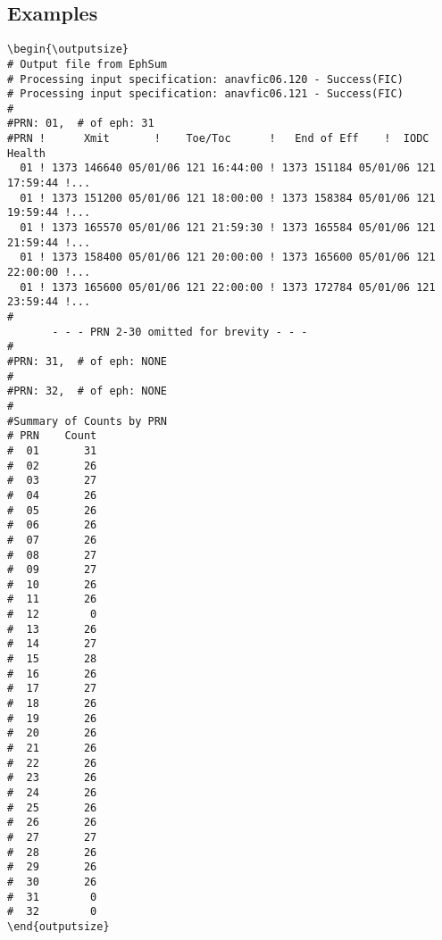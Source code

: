 \subsection{Examples}
\begin{verbatim}
\begin{\outputsize}
# Output file from EphSum
# Processing input specification: anavfic06.120 - Success(FIC)
# Processing input specification: anavfic06.121 - Success(FIC)
#
#PRN: 01,  # of eph: 31
#PRN !      Xmit       !    Toe/Toc      !   End of Eff    !  IODC   Health
  01 ! 1373 146640 05/01/06 121 16:44:00 ! 1373 151184 05/01/06 121 17:59:44 !... 
  01 ! 1373 151200 05/01/06 121 18:00:00 ! 1373 158384 05/01/06 121 19:59:44 !...
  01 ! 1373 165570 05/01/06 121 21:59:30 ! 1373 165584 05/01/06 121 21:59:44 !...
  01 ! 1373 158400 05/01/06 121 20:00:00 ! 1373 165600 05/01/06 121 22:00:00 !...
  01 ! 1373 165600 05/01/06 121 22:00:00 ! 1373 172784 05/01/06 121 23:59:44 !...
#
       - - - PRN 2-30 omitted for brevity - - -
#
#PRN: 31,  # of eph: NONE
#
#PRN: 32,  # of eph: NONE
#
#Summary of Counts by PRN
# PRN    Count
#  01       31
#  02       26
#  03       27
#  04       26
#  05       26
#  06       26
#  07       26
#  08       27
#  09       27
#  10       26
#  11       26
#  12        0
#  13       26
#  14       27
#  15       28
#  16       26
#  17       27
#  18       26
#  19       26
#  20       26
#  21       26
#  22       26
#  23       26
#  24       26
#  25       26
#  26       26
#  27       27
#  28       26
#  29       26
#  30       26
#  31        0
#  32        0
\end{outputsize}
\end{verbatim}
%
